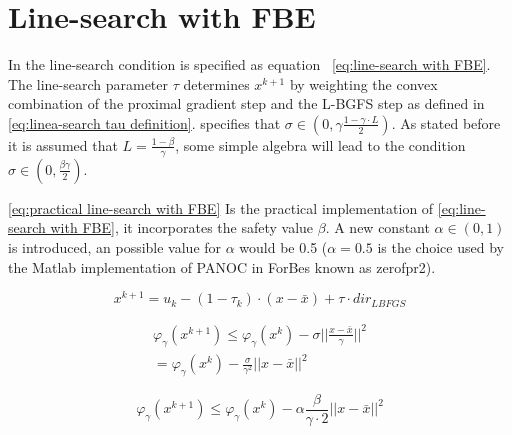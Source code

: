 	
	\section{Line-search with FBE}
	In \cite{LorenzoStella2017} the line-search condition is specified as equation ~\eqref{eq:line-search with FBE}. The line-search parameter $\tau$ determines $x^{k+1}$ by weighting the convex combination of the proximal gradient step and the L-BGFS step as defined in \eqref{eq:linea-search tau definition}.  \cite{LorenzoStella2017} specifies that $\sigma \in (0, \gamma \frac{1-\gamma\cdot L}{2})$. As stated before it is assumed that $L=\frac{1-\beta}{\gamma}$, some simple algebra will lead to the condition $\sigma \in (0,\frac{\beta \gamma}{2})$.
	
	 \eqref{eq:practical line-search with FBE} Is the practical implementation of \eqref{eq:line-search with FBE}, it incorporates the safety value $\beta$. A new constant $\alpha \in (0,1)$ is introduced, an possible value for $\alpha$ would be 0.5 ($\alpha=0.5$ is the choice used by the Matlab implementation of PANOC in ForBes known as zerofpr2).
	
	\begin{equation}
		x^{k+1} = u_k - (1-\tau_k)\cdot (x-\bar{x}) + \tau \cdot dir_{LBFGS}
		\label{eq:linea-search tau definition}
	\end{equation}
	
	\begin{eqnarray}
		\label{eq:line-search with FBE}
		\varphi_{\gamma}(x^{k+1})\leq\varphi_{\gamma}(x^{k}) - \sigma ||\frac{x-\bar{x}}{\gamma}||^2 \\
		=
		\varphi_{\gamma}(x^{k}) - \frac{\sigma}{\gamma^2} ||x-\bar{x}||^2
	\end{eqnarray}
	
	\begin{equation}
		\varphi_{\gamma}(x^{k+1}) \leq 		\varphi_{\gamma}(x^{k}) - \alpha \frac{\beta }{\gamma \cdot 2} ||x-\bar{x}||^2
		\label{eq:practical line-search with FBE}
	\end{equation}
	
	
		
